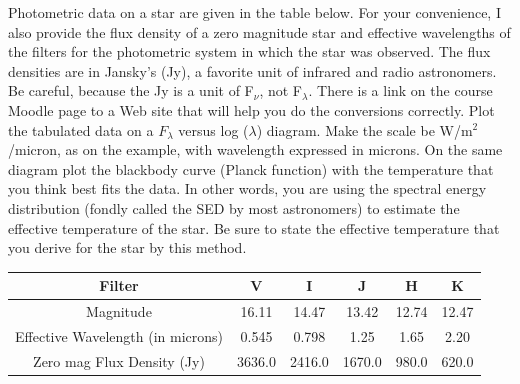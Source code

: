 \documentclass[12pt]{article}
\newenvironment{problem}[2][Problem]{\begin{trivlist}
\item[\hskip \labelsep {\bfseries #1}\hskip \labelsep {\bfseries #2.}]}{\end{trivlist}}
\begin{document}
\begin{problem}{3}
Photometric data on a star are given in the table below. For your convenience, I also provide the flux density of a zero magnitude star and effective wavelengths of the filters for the photometric system in which the star was observed. The flux densities are in Jansky's (Jy), a favorite unit of infrared and radio astronomers. Be careful, because the Jy is a unit of F$_\nu$, not F$_\lambda$. There is a link on the course Moodle page to a Web site that will help you do the conversions correctly. Plot the tabulated data on a $F_\lambda$ versus log ($\lambda$) diagram. Make the scale be W/m$^2$/micron, as on the example, with wavelength expressed in microns. On the same diagram plot the blackbody curve (Planck function) with the temperature that you think best fits the data. In other words, you are using the spectral energy distribution (fondly called the SED by most astronomers) to estimate the effective temperature of the star. Be sure to state the effective temperature that you derive for the star by this method.
\bigskip
\smallskip

\begin{tabular} {cccccc}

Filter & V & I & J & H & K \\
\hline
\hline
Magnitude & 16.11 & 14.47 & 13.42 & 12.74 & 12.47 \\
Effective Wavelength (in microns) & 0.545 & 0.798 & 1.25 & 1.65 & 2.20 \\
Zero mag Flux Density (Jy) & 3636.0 & 2416.0 & 1670.0 & 980.0 & 620.0 \\
\hline

\end{tabular}

\end{problem}
\end{document}
